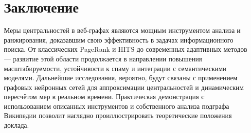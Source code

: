 \documentclass[12pt, a4paper]{article}
\begin{document}
\newpage
\section{Заключение}

Меры центральностей в веб-графах являются мощным инструментом анализа и ранжирования, доказавшим свою эффективность в задачах информационного поиска. От классических PageRank и HITS до современных адаптивных методов — развитие этой области продолжается в направлении повышения масштабируемости, устойчивости к спаму и интеграции с семантическими моделями. Дальнейшие исследования, вероятно, будут связаны с применением графовых нейронных сетей для аппроксимации центральностей и динамическим пересчётом мер в реальном времени. Практическая демонстрация с использованием описанных инструментов и собственного анализа подграфа Википедии позволит наглядно проиллюстрировать теоретические положения доклада.

\newpage
\end{document}
